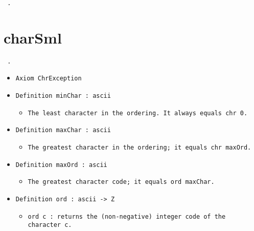 \documentclass[11pt]{report}
\begin{document}
\begin{coqdoccode}
\coqdocemptyline
\coqdocnoindent
\texttt{ .\coqdoceol}
\end{coqdoccode}
\section*{charSml}

\begin{coqdoccode}
\coqdocemptyline
\coqdocnoindent
\texttt{ .\coqdoceol}
\coqdocemptyline
\end{coqdoccode}



\begin{itemize}
\item  \texttt{Axiom ChrException}



\item  \texttt{Definition minChar : ascii}

\begin{itemize}
\item  \texttt{The least character in the ordering. It always equals chr 0.}
\end{itemize}

\item  \texttt{Definition maxChar : ascii}

\begin{itemize}
\item  \texttt{The greatest character in the ordering; it equals chr maxOrd.}
\end{itemize}

\item  \texttt{Definition maxOrd : ascii}

\begin{itemize}
\item  \texttt{The greatest character code; it equals ord maxChar.}



\end{itemize}

\item \texttt{Definition ord : ascii -> Z}

\begin{itemize}
\item  \texttt{ord c : returns the (non-negative) integer code of the character c.}
\end{itemize}


\end{itemize}
\end{document}
